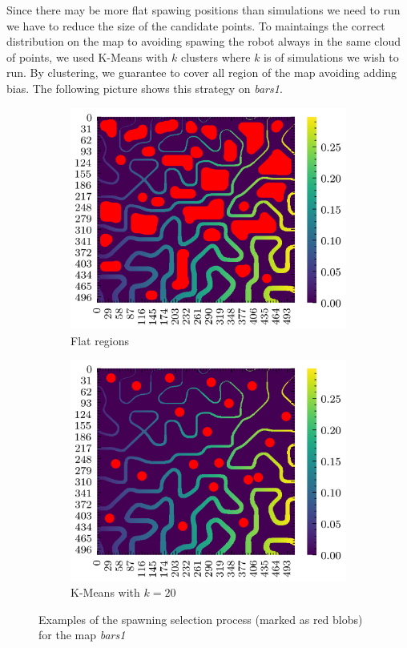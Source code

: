 \documentclass[../document.tex]{subfiles}
\begin{document}
Since there may be more flat spawing positions than simulations we need to run we have to reduce the size of the candidate points. To maintaings the correct distribution on the map to avoiding 
spawing the robot always in the same cloud of points, we used K-Means with $k$ clusters where $k$ is of simulations we wish to run. By clustering, we guarantee to cover all region of the map avoiding adding bias. The following picture shows this strategy on \emph{bars1}. 
\begin{figure}[H]
    \begin{subfigure}[b]{0.5\textwidth}
        \includegraphics[width=\textwidth]{../img/3/spawn/flat-spawn-10.png}
        \caption{Flat regions}
    \end{subfigure}
    \begin{subfigure}[b]{0.5\textwidth}
        \includegraphics[width=\textwidth]{../img/3/spawn/spawn-10.png}
        \caption{K-Means with $k=20$}
    \end{subfigure}  
\label{fig: spawn-strat}
\caption{Examples of the spawning selection process (marked as red blobs) for the map \emph{bars1} }   
\end{figure}
\end{document}
